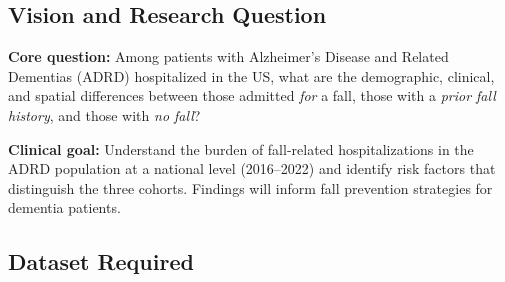 \documentclass[11pt,letterpaper]{article}
\begin{document}
\subsection{Vision and Research Question}

\begin{tcolorbox}[colback=lightgray, colframe=projblue!50]
\textbf{Core question:} Among patients with Alzheimer's Disease and Related Dementias
(ADRD) hospitalized in the US, what are the demographic, clinical, and spatial differences
between those admitted \emph{for} a fall, those with a \emph{prior fall history}, and those
with \emph{no fall}?

\medskip
\textbf{Clinical goal:} Understand the burden of fall-related hospitalizations in the
ADRD population at a national level (2016–2022) and identify risk factors that distinguish
the three cohorts. Findings will inform fall prevention strategies for dementia patients.
\end{tcolorbox}

\subsection{Dataset Required}
\end{document}

